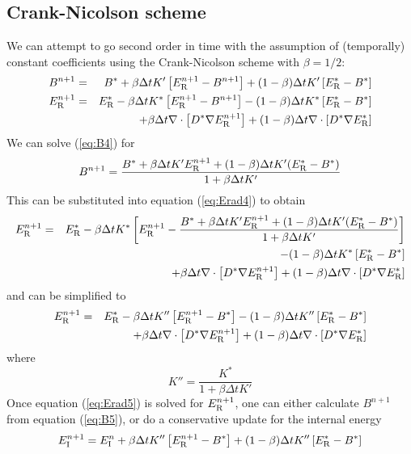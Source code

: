 \documentclass[12pt]{article}
\newcommand{\Eint}{E_{\rm I}}
\newcommand{\Erad}{E_{\rm R}}
\begin{document}
\newpage

\subsection{Crank-Nicolson scheme}

We can attempt to go second order in time with the assumption of
(temporally) constant coefficients using the Crank-Nicolson scheme
with $\beta=1/2$:
\begin{eqnarray}
B^{n+1} &=& B^* 
   + \beta \Delta t K'\left[\Erad^{n+1} - B^{n+1}\right]  
   + (1-\beta)\Delta t K'\left[\Erad^* - B^*\right]  
   \label{eq:B4}\\
\Erad^{n+1} &=& \Erad^* 
   - \beta \Delta t K^*\left[\Erad^{n+1} - B^{n+1} \right]
   - (1-\beta) \Delta t K^*\left[\Erad^* - B^*\right] \nonumber\\
   && + \beta\Delta t \nabla\cdot\left[ D^* \nabla \Erad^{n+1} \right]
      + (1-\beta)\Delta t \nabla\cdot\left[ D^* \nabla \Erad^* \right]
   \label{eq:Erad4}
\end{eqnarray}
We can solve (\ref{eq:B4}) for 
\begin{equation}
  B^{n+1} = \frac{B^* + \beta \Delta t K' \Erad^{n+1}
                  + (1-\beta)  \Delta t K' (\Erad^* - B^*)}
                 {1 + \beta\Delta t K'}
   \label{eq:B5}
\end{equation}
This can be substituted into equation (\ref{eq:Erad4}) to obtain
\begin{eqnarray}
\Erad^{n+1} &=& \Erad^* - \beta \Delta t K^*\left[\Erad^{n+1} 
              - \frac{B^* + \beta \Delta t K' \Erad^{n+1}
                      + (1-\beta)  \Delta t K' (\Erad^* - B^*)}
                     {1 + \beta\Delta t K'}\right] \nonumber\\
  && - (1-\beta) \Delta t K^*\left[\Erad^* - B^*\right] \nonumber\\
  && +     \beta \Delta t \nabla\cdot\left[ D^* \nabla \Erad^{n+1} \right]
      + (1-\beta)\Delta t \nabla\cdot\left[ D^* \nabla \Erad^* \right]
\end{eqnarray}
and can be simplified to
\begin{eqnarray}
\Erad^{n+1} &=& \Erad^* - \beta \Delta t K''\left[\Erad^{n+1} 
              - B^*  \right] 
    - (1-\beta) \Delta t K'' \left[\Erad^* - B^*\right] \nonumber\\
  && +     \beta \Delta t \nabla\cdot\left[ D^* \nabla \Erad^{n+1} \right]
      + (1-\beta)\Delta t \nabla\cdot\left[ D^* \nabla \Erad^* \right]
  \label{eq:Erad5}
\end{eqnarray}
where
\begin{equation}
K'' = \frac{K^*}{1 + \beta \Delta t K'} 
\end{equation}
Once equation (\ref{eq:Erad5}) is solved for $\Erad^{n+1}$, one can 
either calculate $B^{n+1}$ from equation (\ref{eq:B5}), 
or do a conservative update for the internal energy
\begin{equation}
  \Eint^{n+1} = \Eint^n + \beta \Delta t K''\left[\Erad^{n+1} - B^*\right]
                        + (1-\beta) \Delta t K''\left[\Erad^* - B^*\right]
\end{equation}
\end{document}
